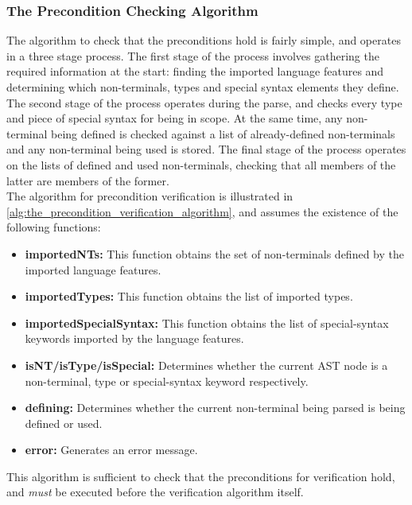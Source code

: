 \subsubsection{The Precondition Checking Algorithm} %
\label{ssub:the_precondition_checking_algorithm}
The algorithm to check that the preconditions hold is fairly simple, and operates in a three stage process.
The first stage of the process involves gathering the required information at the start: finding the imported language features and determining which non-terminals, types and special syntax elements they define.
The second stage of the process operates during the parse, and checks every type and piece of special syntax for being in scope. 
At the same time, any non-terminal being defined is checked against a list of already-defined non-terminals and any non-terminal being used is stored.
The final stage of the process operates on the lists of defined and used non-terminals, checking that all members of the latter are members of the former.\\

The algorithm for precondition verification is illustrated in \autoref{alg:the_precondition_verification_algorithm}, and assumes the existence of the following functions:
\begin{itemize}
    \item \textbf{importedNTs:} This function obtains the set of non-terminals defined by the imported language features.
    \item \textbf{importedTypes:} This function obtains the list of imported types.
    \item \textbf{importedSpecialSyntax:} This function obtains the list of special-syntax keywords imported by the language features. 
    \item \textbf{isNT/isType/isSpecial:} Determines whether the current AST node is a non-terminal, type or special-syntax keyword respectively.
    \item \textbf{defining:} Determines whether the current non-terminal being parsed is being defined or used. 
    \item \textbf{error:} Generates an error message.
\end{itemize}

This algorithm is sufficient to check that the preconditions for verification hold, and \textit{must} be executed before the verification algorithm itself.

